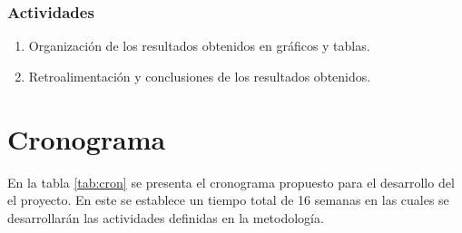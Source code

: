 \documentclass[12pt]{article}
\begin{document}
\subsubsection*{Actividades}

\begin{enumerate}[label=\thesubsection.\arabic*., wide, labelindent=2em, leftmargin=5em]
	\item Organización de los resultados obtenidos en gráficos y tablas.
	\item Retroalimentación y conclusiones de los resultados obtenidos.
\end{enumerate}

\section{Cronograma}

En la tabla \ref{tab:cron} se presenta el cronograma propuesto para el desarrollo del el proyecto. En este se establece un tiempo total de 16 semanas en las cuales se desarrollarán las actividades definidas en la metodología.
\end{document}
